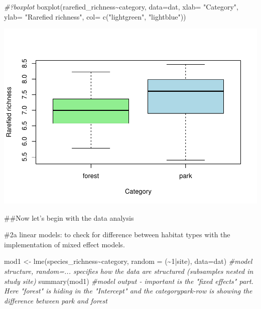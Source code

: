 \documentclass[
]{article}
\newenvironment{Shaded}{\begin{snugshade}}{\end{snugshade}}
\newcommand{\AttributeTok}[1]{\textcolor[rgb]{0.77,0.63,0.00}{#1}}
\newcommand{\CommentTok}[1]{\textcolor[rgb]{0.56,0.35,0.01}{\textit{#1}}}
\newcommand{\DecValTok}[1]{\textcolor[rgb]{0.00,0.00,0.81}{#1}}
\newcommand{\FunctionTok}[1]{\textcolor[rgb]{0.00,0.00,0.00}{#1}}
\newcommand{\NormalTok}[1]{#1}
\newcommand{\OtherTok}[1]{\textcolor[rgb]{0.56,0.35,0.01}{#1}}
\newcommand{\SpecialCharTok}[1]{\textcolor[rgb]{0.00,0.00,0.00}{#1}}
\newcommand{\StringTok}[1]{\textcolor[rgb]{0.31,0.60,0.02}{#1}}
\begin{document}
\begin{Shaded}
\begin{Highlighting}[]
\CommentTok{\#?boxplot}
\FunctionTok{boxplot}\NormalTok{(rarefied\_richness}\SpecialCharTok{\textasciitilde{}}\NormalTok{category, }\AttributeTok{data=}\NormalTok{dat, }\AttributeTok{xlab=} \StringTok{"Category"}\NormalTok{, }\AttributeTok{ylab=} \StringTok{"Rarefied richness"}\NormalTok{, }\AttributeTok{col=} \FunctionTok{c}\NormalTok{(}\StringTok{"lightgreen"}\NormalTok{, }\StringTok{"lightblue"}\NormalTok{))}
\end{Highlighting}
\end{Shaded}

\includegraphics{birdsdataanalysis_files/figure-latex/unnamed-chunk-6-6.pdf}

\#\#Now let's begin with the data analysis

\#2a linear models: to check for difference between habitat types with
the implementation of mixed effect models.

\begin{Shaded}
\begin{Highlighting}[]
\NormalTok{mod1 }\OtherTok{\textless{}{-}} \FunctionTok{lme}\NormalTok{(species\_richness}\SpecialCharTok{\textasciitilde{}}\NormalTok{category, }\AttributeTok{random =}\NormalTok{ (}\SpecialCharTok{\textasciitilde{}}\DecValTok{1}\SpecialCharTok{|}\NormalTok{site), }\AttributeTok{data=}\NormalTok{dat) }\CommentTok{\#model structure, random=... specifies how the data are structured (subsamples nested in study site)}
\FunctionTok{summary}\NormalTok{(mod1) }\CommentTok{\#model output {-} important is the "fixed effects" part. Here "forest" is hiding in the "Intercept" and the categorypark{-}row is showing the difference between park and forest}
\end{Highlighting}
\end{Shaded}
\end{document}
